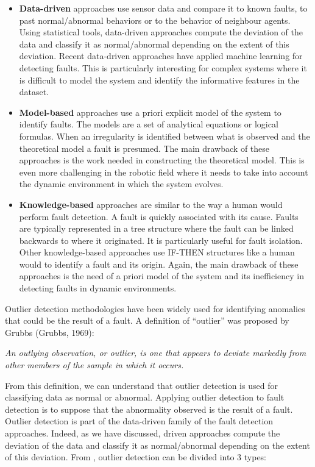 \begin{itemize}
\item \textbf{Data-driven} approaches use sensor data and compare it to known faults, to past normal/abnormal behaviors or to the behavior of neighbour agents. Using statistical tools, data-driven approaches compute the deviation of the data and classify it as normal/abnormal depending on the extent of this deviation.  Recent data-driven approaches have applied machine learning for detecting faults. This is particularly interesting for complex systems where it is difficult to model the system and identify the informative features in the dataset.
\item \textbf{Model-based} approaches use a priori explicit model of the system to identify faults. The models are a set of analytical equations or logical formulas. When an irregularity is identified between what is observed and the theoretical model a fault is presumed. The main drawback of these approaches is the work needed in constructing the theoretical model. This is even more challenging in the robotic field where it needs to take into account the dynamic environment in which the system evolves. 
\item \textbf{Knowledge-based} approaches are similar to the way a human would perform fault detection. A fault is quickly associated with its cause. Faults are typically represented in a tree structure where the fault can be linked backwards to where it originated. It is particularly useful for fault isolation. Other knowledge-based approaches use IF-THEN structures like a human would to identify a fault and its origin. Again, the main drawback of these approaches is the need of a priori model of the system and its inefficiency in detecting faults in dynamic environments.
\end{itemize}


Outlier detection methodologies have been widely used for identifying anomalies that could be the result of a fault. A definition of “outlier” was proposed by Grubbs (Grubbs, 1969): 

\begin{center}
\textit{An outlying observation, or outlier, is one that appears to deviate
markedly from other members of the sample in which it occurs.}
\end{center} 

From this definition, we can understand that outlier detection is used for classifying data as normal or abnormal. Applying outlier detection to fault detection is to suppose that the abnormality observed is the result of a fault. Outlier detection is part of the data-driven family of the fault detection approaches.  Indeed, as we have discussed, driven approaches compute the deviation of the data and classify it as normal/abnormal depending on the extent of this deviation. From \cite{hodge2004survey}, outlier detection can be divided into 3 types: 

